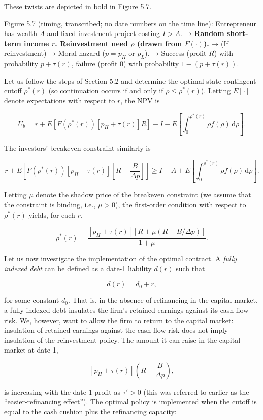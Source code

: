 \documentclass[11pt,a4paper]{article}
\begin{document}
These twists are depicted in bold in Figure 5.7.

Figure 5.7 (timing, transcribed; no date numbers on the time line): Entrepreneur has wealth \(A\)
and fixed-investment project costing \(I > A\). → \textbf{Random short-term income \(r\).
Reinvestment need \(\rho\) (drawn from \(F(\cdot)\)).} → (If reinvestment) → Moral hazard
(\(p = p_H\) or \(p_L\)). → Success (profit \(R\)) with probability \(p + \tau(r)\), failure (profit
0) with probability \(1 - (p + \tau(r))\).

Let us follow the steps of Section 5.2 and determine the optimal state-contingent cutoff
\(\rho^*(r)\) (so continuation occurs if and only if \(\rho \leqslant \rho^*(r)\)). Letting
\(E[\cdot]\) denote expectations with respect to \(r\), the NPV is

\[U_b = \bar r + E[F(\rho^*(r))[p_H + \tau(r)]R] - I - E\left[\int_0^{\rho^*(r)}\rho f(\rho)\,\mathrm{d}\rho\right].\]

The investors' breakeven constraint similarly is

\[\bar r + E\left[F(\rho^*(r))[p_H + \tau(r)]\left[R - \frac{B}{\Delta p}\right]\right] \geqslant I - A + E\left[\int_0^{\rho^*(r)}\rho f(\rho)\,\mathrm{d}\rho\right].\]

Letting \(\mu\) denote the shadow price of the breakeven constraint (we assume that the constraint
is binding, i.e., \(\mu > 0\)), the first-order condition with respect to \(\rho^*(r)\) yields, for
each \(r\),

\[\rho^*(r) = \frac{[p_H + \tau(r)][R + \mu(R - B/\Delta p)]}{1 + \mu}.\]

Let us now investigate the implementation of the optimal contract. A \emph{fully indexed debt} can
be defined as a date-1 liability \(d(r)\) such that

\[d(r) = d_0 + r,\]

for some constant \(d_0\). That is, in the absence of refinancing in the capital market, a fully
indexed debt insulates the firm's retained earnings against its cash-flow risk. We, however, want to
allow the firm to return to the capital market: insulation of retained earnings against the
cash-flow risk does not imply insulation of the reinvestment policy. The amount it can raise in the
capital market at date 1,

\[[p_H + \tau(r)]\left(R - \frac{B}{\Delta p}\right),\]

is increasing with the date-1 profit as \(\tau' > 0\) (this was referred to earlier as the
``easier-refinancing effect''). The optimal policy is implemented when the cutoff is equal to the
cash cushion plus the refinancing capacity:
\end{document}
